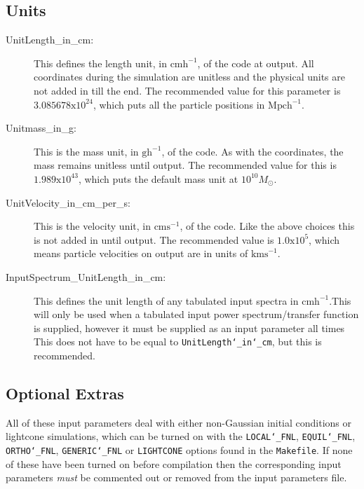 \documentclass[12pt,twoside,a4paper]{article}
\begin{document}
\subsection{Units}
\begin{description}
\item[UnitLength\_in\_cm:]{This defines the length unit, in $\text{cmh}^{-1}$, of the code at output. All coordinates during the simulation are unitless and the physical units are not added in till the end. The recommended value for this parameter is $3.085678\text{x}10^{24}$, which puts all the particle positions in $\text{Mpch}^{-1}$.}
\item[Unitmass\_in\_g:]{This is the mass unit, in $\text{gh}^{-1}$, of the code. As with the coordinates, the mass remains unitless until output. The recommended value for this is $1.989\text{x}10^{43}$, which puts the default mass unit at $10^{10} M_{\odot}$.}
\item[UnitVelocity\_in\_cm\_per\_s:]{This is the velocity unit, in $\text{cms}^{-1}$, of the code. Like the above choices this is not added in until output. The recommended value is $1.0\text{x}10^{5}$, which means particle velocities on output are in units of $\text{kms}^{-1}$.}
\item[InputSpectrum\_UnitLength\_in\_cm:]{This defines the unit length of any tabulated input spectra in $\text{cmh}^{-1}$.This will only be used when a tabulated input power spectrum/transfer function is supplied, however it must be supplied as an input parameter all times This does not have to be equal to \texttt{UnitLength\char`_in\char`_cm}, but this is recommended.}
\end{description}

\subsection{Optional Extras}
All of these input parameters deal with either non-Gaussian initial conditions or lightcone simulations, which can be turned on with the \texttt{LOCAL\char`_FNL}, \texttt{EQUIL\char`_FNL}, \texttt{ORTHO\char`_FNL}, \texttt{GENERIC\char`_FNL} or \texttt{LIGHTCONE} options found in the \texttt{Makefile}. If none of these have been turned on before compilation then the corresponding input parameters \emph{must} be commented out or removed from the input parameters file.
\end{document}
